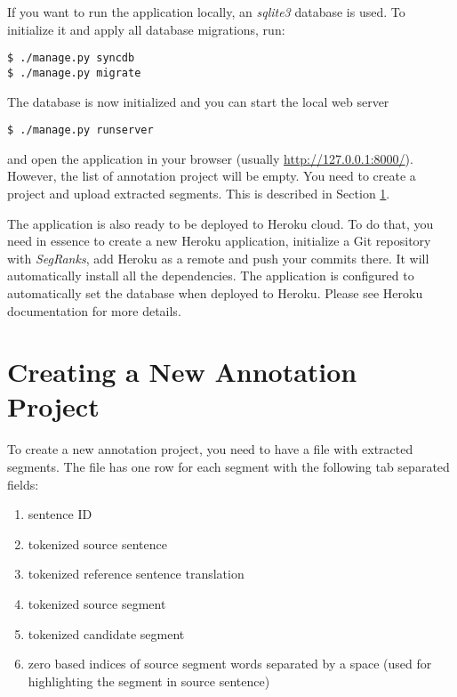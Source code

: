 \noindent
If you want to run the application locally, an \textit{sqlite3} database is
used. To initialize it and apply all database migrations, run:

\begin{verbatim}
$ ./manage.py syncdb 
$ ./manage.py migrate 
\end{verbatim}

\noindent
The database is now initialized and you can start the local web server

\begin{verbatim}
$ ./manage.py runserver
\end{verbatim}

\noindent
and open the application in your browser (usually \url{http://127.0.0.1:8000/}).
However, the list of annotation project will be empty. You need to create
a project and upload extracted segments. This is described in Section \ref{creating-project}.

The application is also ready to be deployed to Heroku cloud. To do that, you
need in essence to create a new Heroku application, initialize a Git repository
with \textit{SegRanks}, add Heroku as a remote and push your commits there.  It
will automatically install all the dependencies. The application is configured
to automatically set the database when deployed to Heroku. Please see Heroku
documentation for more details.

\section{Creating a New Annotation Project}
\label{creating-project}

To create a new annotation project, you need to have a file with extracted
segments.  The file has one row for each segment with the following tab
separated fields:

\begin{enumerate}
  \item sentence ID
  \item tokenized source sentence
  \item tokenized reference sentence translation
  \item tokenized source segment
  \item tokenized candidate segment 
  \item zero based indices of source segment words separated by a space (used for highlighting the segment in source sentence)
\end{enumerate}

